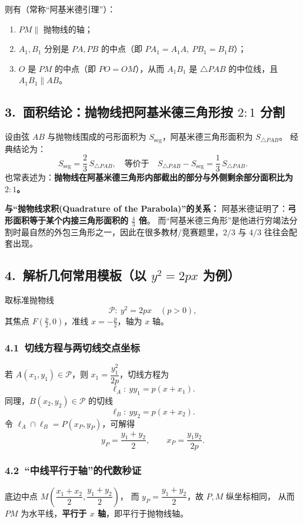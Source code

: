 \documentclass[UTF8]{ctexart}
\begin{document}
	则有（常称“阿基米德引理”）：
	\begin{enumerate}
		\item $PM \parallel$ 抛物线的轴；
		\item $A_1,B_1$ 分别是 $PA,PB$ 的中点（即 $PA_1=A_1A,\ PB_1=B_1B$）；
		\item $O$ 是 $PM$ 的中点（即 $PO=OM$），从而 $A_1B_1$ 是 $\triangle PAB$ 的中位线，且 $A_1B_1 \parallel AB$。
	\end{enumerate}
	
	\subsection*{3.\ 面积结论：抛物线把阿基米德三角形按 $2:1$ 分割}
	设由弦 $AB$ 与抛物线围成的弓形面积为 $S_{\text{seg}}$，阿基米德三角形面积为 $S_{\triangle PAB}$。
	经典结论为：
	\[
	S_{\text{seg}}=\frac{2}{3}\,S_{\triangle PAB},
	\quad\text{等价于}\quad
	S_{\triangle PAB}-S_{\text{seg}}=\frac{1}{3}\,S_{\triangle PAB}.
	\]
	也常表述为：\textbf{抛物线在阿基米德三角形内部截出的部分与外侧剩余部分面积比为 $2:1$。}
	
	\textbf{与“抛物线求积(Quadrature of the Parabola)”的关系：}
	阿基米德证明了：\textbf{弓形面积等于某个内接三角形面积的 $\frac{4}{3}$ 倍}。
	而“阿基米德三角形”是他进行穷竭法分割时最自然的外包三角形之一，因此在很多教材/竞赛题里，$2/3$ 与 $4/3$ 往往会配套出现。
	
	\subsection*{4.\ 解析几何常用模板（以 $y^2=2px$ 为例）}
	取标准抛物线
	\[
	\mathcal P:\ y^2=2px\quad(p>0),
	\]
	其焦点 $F\left(\frac p2,0\right)$，准线 $x=-\frac p2$，轴为 $x$ 轴。
	
	\subsubsection*{4.1\ 切线方程与两切线交点坐标}
	若 $A(x_1,y_1)\in\mathcal P$，则 $x_1=\dfrac{y_1^2}{2p}$，切线方程为
	\[
	\ell_A:\ yy_1=p(x+x_1).
	\]
	同理，$B(x_2,y_2)\in\mathcal P$ 的切线
	\[
	\ell_B:\ yy_2=p(x+x_2).
	\]
	令 $\ell_A\cap\ell_B=P(x_P,y_P)$，可解得
	\[
	y_P=\frac{y_1+y_2}{2},\qquad
	x_P=\frac{y_1y_2}{2p}.
	\]
	
	\subsubsection*{4.2\ “中线平行于轴”的代数秒证}
	底边中点 $M\!\left(\dfrac{x_1+x_2}{2},\dfrac{y_1+y_2}{2}\right)$，
	而 $y_P=\dfrac{y_1+y_2}{2}$，故 $P,M$ 纵坐标相同，
	从而 $PM$ 为水平线，\textbf{平行于 $x$ 轴}，即平行于抛物线轴。
	
\end{document}
